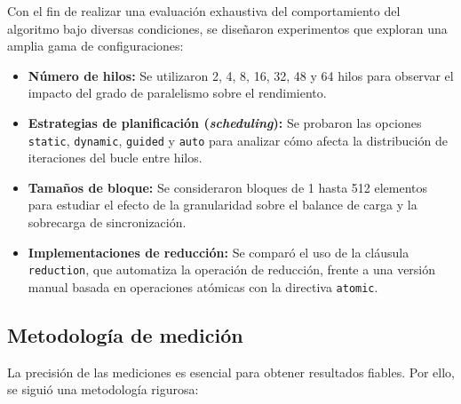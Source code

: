         Con el fin de realizar una evaluación exhaustiva del comportamiento del algoritmo bajo diversas condiciones, se diseñaron experimentos que exploran una amplia gama de configuraciones:
        
        \begin{itemize}
        
            \item \textbf{Número de hilos:} Se utilizaron 2, 4, 8, 16, 32, 48 y 64 hilos para observar el impacto del grado de paralelismo sobre el rendimiento.
            
            \item \textbf{Estrategias de planificación (\textit{scheduling}):} Se probaron las opciones \texttt{static}, \texttt{dynamic}, \texttt{guided} y \texttt{auto} para analizar cómo afecta la distribución de iteraciones del bucle entre hilos.
            
            \item \textbf{Tamaños de bloque:} Se consideraron bloques de 1 hasta 512 elementos para estudiar el efecto de la granularidad sobre el balance de carga y la sobrecarga de sincronización.
            
            \item \textbf{Implementaciones de reducción:} Se comparó el uso de la cláusula \texttt{reduction}, que automatiza la operación de reducción, frente a una versión manual basada en operaciones atómicas con la directiva \texttt{atomic}.
            
        \end{itemize}

    \subsection{Metodología de medición}

        La precisión de las mediciones es esencial para obtener resultados fiables. Por ello, se siguió una metodología rigurosa:
        
